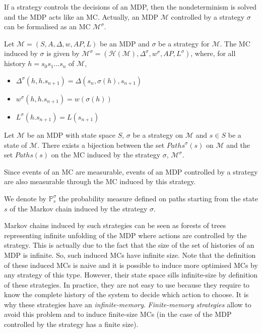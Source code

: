 If a strategy controls the decisions of an MDP, then the nondeterminism is solved
and the MDP acts like an MC. Actually, an MDP $\mathcal{M}$ controlled by a strategy $\sigma$ can be formalised as an MC $\mathcal{M}^\sigma$.

\begin{definition}
Let $\mathcal{M} = (S, A, \Delta, w, AP, L)$ be an MDP and $\sigma$ be a strategy for
$\mathcal{M}$. The MC induced by $\sigma$ is given by
$ \mathcal{M}^\sigma = (\mathcal{H}(\mathcal{M}), \Delta^\sigma, w^\sigma, AP, L^\sigma) $, where, for all history
$h = s_0 s_1 \dots s_n$ of $\mathcal{M}$,
\begin{itemize}
\item $\Delta^\sigma(h, h . s_{n+1}) = \Delta(s_n, \sigma(h), s_{n+1})$
\item $w^\sigma(h, h . s_{n+1}) = w(\sigma(h))$
\item $L^\sigma(h . s_{n+1}) = L(s_{n+1})$
\end{itemize}
\end{definition}
\begin{property}
  Let $\mathcal{M}$ be an MDP with state space $S$, $\sigma$ be a strategy on $\mathcal{M}$ and $s\in S$ be a state of $\mathcal{M}$. There exists a bijection between the
  set $Paths^\sigma(s)$ on $\mathcal{M}$ and the set $Paths(s)$ on the MC induced by the strategy $\sigma$, $\mathcal{M}^\sigma$.
\end{property}
Since events of an MC are measurable, events of an MDP controlled by a strategy are also measurable through the MC induced by this strategy.
\begin{notation}
  We denote by $\mathbb{P}_s^\sigma$ the probability measure defined on paths starting from the state $s$ of the Markov chain induced by the strategy $\sigma$.
\end{notation}

Markov chains induced by such strategies can be seen as forests of trees representing infinite
unfolding of the MDP where actions are controlled by  the
strategy. This is actually due to the fact that the size of the set of histories
of an MDP is infinite. So, such induced MCs have infinite
size.
Note that the definition of these induced MCs is naive and it is possible to induce more optimised MCs by any strategy of this type.
However, their state space sills infinite-size by definition of these strategies.
In practice, they are not easy to use because they require to
know the complete history of the system to decide which action to choose. It is why these strategies have an \textit{infinite-memory}. \textit{Finite-memory strategies} allow to avoid this problem and to induce finite-size MCs (in the case of the MDP controlled by the strategy has a finite size).

